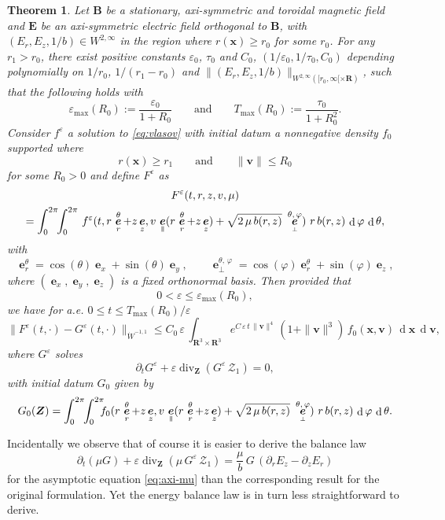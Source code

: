 \documentclass[10pt]{amsart}
\let\mathcal\mathscr
\newcommand{\sperp}{{\scriptscriptstyle\perp}}
\let\eps\varepsilon
\let\d\partial
\DeclareMathOperator\dD{d}\let\dd\dD
\DeclareMathOperator{\Div}{div}
\theoremstyle{plain}
\newtheorem{theorem}{Theorem}[section]
\theoremstyle{definition}
\newcommand{\be}{\begin{equation}}
\newcommand{\ee}{\end{equation}}
\newcommand{\bt}{\begin{theorem}}
\newcommand{\et}{\end{theorem}}
\newcommand\R{\mathbf R}
\newcommand\bB{{\boldsymbol B}}
\newcommand\bE{{\boldsymbol E}}
\newcommand\bfv{{\boldsymbol v}}
\newcommand\bfx{{\boldsymbol x}}
\newcommand\bfZ{{\boldsymbol Z}}
\newcommand\cZ{{\mathcal Z}}
\DeclareMathOperator{\beD}{\boldsymbol{e}}
\newcommand\eDx{\beD_x}
\newcommand\eDy{\beD_y}
\newcommand\eDr{\beD_r}
\newcommand\eDz{\beD_z}
\newcommand\eDpar{\beD_\mypar}
\newcommand\eDperp{\beD_\sperp}
\newcommand\Er{E_r}
\newcommand\Ez{E_z}
\newcommand{\mypar}{{\mkern3mu\vphantom{\perp}\vrule depth 0pt\mkern2mu\vrule depth 0pt\mkern3mu}}
\begin{document}
\bt
\label{th:3-mu}
Let $\bB$ be a stationary, axi-symmetric and toroidal magnetic field and $\bE$ be
an axi-symmetric electric field orthogonal to $\bB$, with $(\Er,\Ez,1/b)\in
W^{2,\infty}$ in the region where $r(\bfx)\geq r_0$ for some
$r_0$. For any $r_1>r_0$, there exist positive constants $\eps_0$, $\tau_0$ and $C_0$, $(1/\eps_0,1/\tau_0,C_0)$ depending polynomially on $1/r_0$, $1/(r_1-r_0)$ and $\|(\Er,\Ez,1/b)\|_{W^{2,\infty}([r_0,\infty[\times\R)}$, such that the following holds with
\[
\eps_{\max}(R_0):=\frac{\eps_0}{1+R_0}\qquad\textrm{and}\qquad
T_{\max}(R_0):=\frac{\tau_0}{1+R_0^2}.
\]
Consider $f^\eps$ a solution to \eqref{eq:vlasov} with initial datum a nonnegative density $f_0$ supported where
\[
r(\bfx)\geq r_1\qquad\textrm{and}\qquad \|\bfv\|\leq R_0
\]
for some $R_0>0$ and define $F^\eps$ as
\begin{multline*}
F^\eps(t,r,z,v,\mu)\\
=\int_0^{2\pi}\!\!\int_0^{2\pi}
\,f^\eps(t,r\,\eDr^\theta+z\eDz,
v\,\eDpar(r\,\eDr^\theta+z\eDz)
+\sqrt{2\,\mu\,b(r,z)}\ \eDperp^{\theta,\,\varphi})\ r\,b(r,z)\,\dD \varphi\,\dD\theta,
\end{multline*}
with
\[
\eDr^\theta=\cos(\theta)\eDx+\sin(\theta)\eDy,\qquad
\eDperp^{\theta,\,\varphi}=\cos(\varphi)\eDr^\theta+\sin(\varphi)\eDz,
\]
where $(\eDx,\eDy,\eDz)$ is a fixed orthonormal basis. Then provided that
\[
0<\eps\leq \eps_{\max}(R_0),
\]
we have for a.e. $0\leq t \leq T_{\max}(R_0)/\eps$
\[
\|F^\eps(t,\cdot)-G^\eps(t,\cdot)\|_{\dot{W}^{-1,1}}\leq C_0\,\eps\,
\int_{\R^3\times\R^3} e^{C\,\eps\,t\,\|\bfv\|^4}\,(1+\|\bfv\|^3)\,f_0(\bfx,\bfv)\,\dD\bfx\,\dD\bfv,
\]
where $G^\eps$ solves
\be\label{eq:axi-mu}
\d_t G^\eps+\eps\Div_{\bfZ} \left(G^\eps\,\cZ_1\right)
=0,
\ee
with initial datum $G_0$ given by
\[
G_0(\bfZ)= \int_0^{2\pi}\!\!\int_0^{2\pi}
\hspace*{-2mm}f_0(r\,\eDr^\theta+z\eDz,
v\,\eDpar(r\,\eDr^\theta+z\eDz)
+\sqrt{2\,\mu\,b(r,z)}\ \eDperp^{\theta,\,\varphi})\ r\,b(r,z)\,\dD \varphi\,\dD\theta.
\]
\et

Incidentally we observe that of course it is easier to derive the balance law
\[
\d_t(\mu G)+\eps\Div_{\bfZ} \left(\mu\,G^\eps\,\cZ_1\right)
=\frac{\mu}{b}\,G\,\left(\d_r\Ez-\d_z\Er\right)
\]
for the asymptotic equation \eqref{eq:axi-mu} than the corresponding result for the original formulation. Yet the energy balance law is in turn less straightforward to derive.
\end{document}

